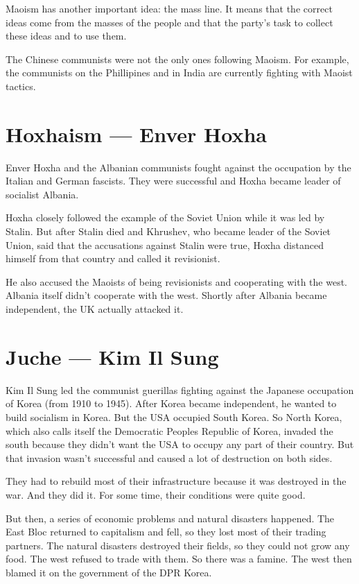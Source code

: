 \documentclass[a4paper]{book}%
\begin{document}
Maoism has another important idea: the mass line. It means that the correct ideas come from the masses of the people and that the party's task to collect these ideas and to use them.

The Chinese communists were not the only ones following Maoism. For example, the communists on the Phillipines and in India are currently fighting with Maoist tactics.

\section{Hoxhaism --- Enver Hoxha}

Enver Hoxha and the Albanian communists fought against the occupation by the Italian and German fascists. They were successful and Hoxha became leader of socialist Albania.

Hoxha closely followed the example of the Soviet Union while it was led by Stalin. But after Stalin died and Khrushev, who became leader of the Soviet Union, said that the accusations against Stalin were true, Hoxha distanced himself from that country and called it revisionist.

He also accused the Maoists of being revisionists and cooperating with the west. Albania itself didn't cooperate with the west. Shortly after Albania became independent, the UK actually attacked it.

\section{Juche --- Kim Il Sung}

Kim Il Sung led the communist guerillas fighting against the Japanese occupation of Korea (from 1910 to 1945). After Korea became independent, he wanted to build socialism in Korea. But the USA occupied South Korea. So North Korea, which also calls itself the Democratic Peoples Republic of Korea, invaded the south because they didn't want the USA to occupy any part of their country. But that invasion wasn't successful and caused a lot of destruction on both sides.

They had to rebuild most of their infrastructure because it was destroyed in the war. And they did it. For some time, their conditions were quite good.

But then, a series of economic problems and natural disasters happened. The East Bloc returned to capitalism and fell, so they lost most of their trading partners. The natural disasters destroyed their fields, so they could not grow any food. The west refused to trade with them. So there was a famine. The west then blamed it on the government of the DPR Korea.
\end{document}
